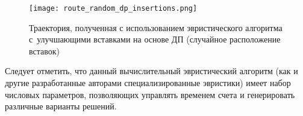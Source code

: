 \begin{figure}[H]
  \centering
  \texttt{[image: route\_random\_dp\_insertions.png]}
  \caption{
    Траектория, полученная с использованием эвристического алгоритма
    с~улучшающими вставками на основе ДП (случайное расположение вставок)
  }
  \label{DP_Random_Inserts_Result}
\end{figure}

Следует отметить,
что данный вычислительный эвристический алгоритм
(как и другие разработанные авторами специализированные эвристики)
имеет набор числовых параметров,
позволяющих управлять временем счета
и генерировать различные варианты решений.
